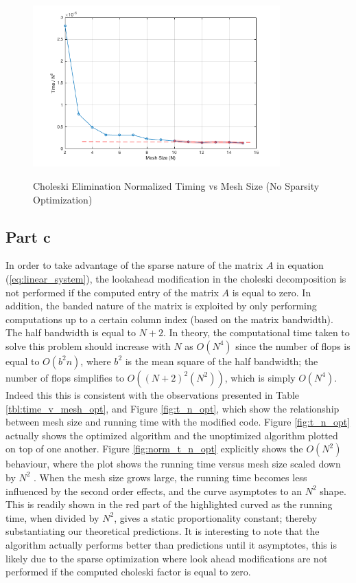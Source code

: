 \documentclass[11pt]{amsart}
\begin{document}
\begin{center}
	\begin{figure}[h]
		\caption{Choleski Elimination Normalized Timing vs Mesh Size (No Sparsity Optimization)}
		\includegraphics[width=0.85\textwidth]{assets/normalized_time_vs_n_unopt.png}\label{fig:norm_t_n_unopt}
	\end{figure}
\end{center}

\subsection*{Part c} In order to take advantage of the sparse nature of the matrix $A$ in equation (\ref{eq:linear_system}), the lookahead modification in the choleski decomposition is not performed if the computed entry of the matrix $A$ is equal to zero. In addition, the banded nature of the matrix is exploited by only performing computations up to a certain column index (based on the matrix bandwidth). The half bandwidth is equal to $N + 2$. In theory, the computational time taken to solve this problem should increase with $N$ as $O(N^4)$ since the number of flops is equal to $O(b^2 n)$, where $b^2$ is the mean square of the half bandwidth; the number of flops simplifies to $O((N+2)^2 (N^2))$, which is simply $O(N^4)$. Indeed this this is consistent with the observations presented in Table \ref{tbl:time_v_mesh_opt}, and Figure \ref{fig:t_n_opt}, which show the relationship between mesh size and running time with the modified code. Figure \ref{fig:t_n_opt} actually shows the optimized algorithm and the unoptimized algorithm plotted on top of one another. Figure \ref{fig:norm_t_n_opt} explicitly shows the $O(N^2)$  behaviour, where the plot shows the running time versus mesh size scaled down by $N^2$ . When the mesh size grows large, the running time becomes less influenced by the second order effects, and the curve asymptotes to an $N^2$ shape. This is readily shown in the red part of the highlighted curved as the running time, when divided by $N^2$, gives a static proportionality constant; thereby substantiating our theoretical predictions. It is interesting to note that the algorithm actually performs better than predictions until it asymptotes, this is likely due to the sparse optimization where look ahead modifications are not performed if the computed choleski factor is equal to zero.
\end{document}
